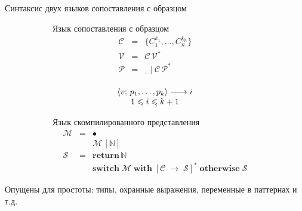 \documentclass[aspectratio=169
  , xcolor={svgnames}
  , hyperref={ colorlinks,citecolor=Blue
             , linkcolor=DarkRed,urlcolor=DarkBlue}
  , russian
  ]{beamer}
\def\transarrow{\xrightarrow}
\def\padding{\phantom{X}}
\def\subarrow{}
\newcommand{\trans}[3]{{#1}\transarrow{\padding{\textstyle #2}\padding}\subarrow{#3}}
\newcommand{\inbr}[1]{\left<{#1}\right>}
\newcommand{\primi}[1]{\ensuremath{\mathbf{#1}}}
\newcommand{\ir}{\ensuremath{\mathcal{S}}}
\begin{document}
\begin{frame}[fragile]{Синтаксис двух языков сопоставления с образцом}
\begin{figure}[ht]
\begin{subfigure}[t]{0.4\linewidth}
Язык сопоставления с образцом
\[
 \begin{array}{rcll}
    \mathcal{C} & = & \{ C_1^{k_1}, \dots, C_n^{k_n} \}\\
    \mathcal{V} & = & \mathcal{C}\,\mathcal{V}^*\\  
    \mathcal{P} & = & \_ \mid \mathcal{C}\,\mathcal{P}^*
 \end{array}
\]

\[
 \begin{array}{c}
\trans{\inbr{v;\,p_1,\dots,p_k}}{}{i}\\
1\leqslant i\leqslant k+1
 \end{array}
\]
\end{subfigure}
\hspace{0.5cm}
\begin{subfigure}[t]{0.5\linewidth}
Язык скомпилированного представления
\[
\begin{array}{rcl}
  \mathcal M & = & \bullet \\
  &   & \mathcal M\,[\mathbb{N}] \\
  \ir & = & \primi{return}\,\mathbb{N} \\
  &   & \primi{switch}\;\mathcal{M}\;\primi{with}\; [\mathcal{C}\; \primi{\rightarrow}\; \ir]^*\;\primi{otherwise}\;\ir
\end{array}
\]
\end{subfigure}
\end{figure}
\vspace{2em}
Опущены для простоты: типы, охранные выражения, переменные в паттернах и т.д.

\end{frame}
\end{document}
